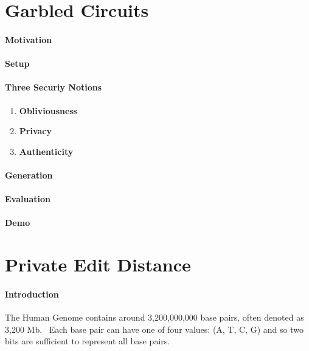 \section{Garbled Circuits}

\paragraph{Motivation}

\paragraph{Setup}

\paragraph{Three Securiy Notions}

\begin{enumerate}
\item \textbf{Obliviousness}
\item \textbf{Privacy}
\item \textbf{Authenticity}
\end{enumerate}

\paragraph{Generation}

\paragraph{Evaluation}

\paragraph{Demo}

\section{Private Edit Distance}

\paragraph{Introduction}
The Human Genome contains around 3,200,000,000 base pairs, often denoted as 3,200 Mb.~\cite{naturegene} Each base pair can have one of four values: (A, T, C, G) and so two bits are sufficient to represent all base pairs.

